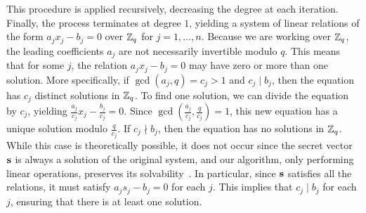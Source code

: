 
This procedure is applied recursively, decreasing the degree at each iteration. Finally, the process terminates at degree $1$, yielding a system of linear relations of the form $a_j x_j - b_j = 0$ over $\mathbb{Z}_q$ for $j=1,\dots,n$. 
Because we are working over $\mathbb{Z}_q$, the leading coefficients $a_j$ are not necessarily invertible modulo $q$. This means that for some $j$, the relation $a_j x_j - b_j = 0$ may have zero or more than one solution. More specifically, if $\gcd(a_j, q) = c_j > 1$ and $c_j \mid b_j$, then the equation has $c_j$ distinct solutions in $\mathbb{Z}_q$. To find one solution, we can divide the equation by $c_j$, yielding $\frac{a_j}{c_j} x_j - \frac{b_j}{c_j} = 0$. Since $\gcd\left(\frac{a_j}{c_j}, \frac{q}{c_j}\right) = 1$, this new equation has a unique solution modulo $\frac{q}{c_j}$. 
If $c_j \nmid b_j$, then the equation has no solutions in $\mathbb{Z}_q$. While this case is theoretically possible, it does not occur since the secret vector $\mathbf{s}$ is always a solution of the original system, and our algorithm, only performing linear operations, preserves its solvability~\cite{DBLP:journals/iandc/GoldmannR02}. In particular, since $\mathbf{s}$ satisfies all the relations, it must satisfy $a_j s_j - b_j = 0$ for each $j$. This implies that $c_j \mid b_j$ for each $j$, ensuring that there is at least one solution.





